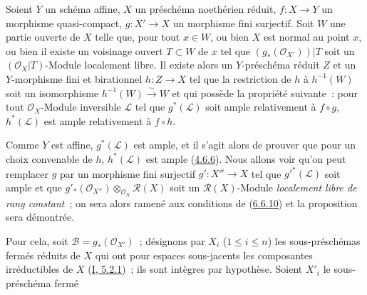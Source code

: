 \begin{proposition}[6.6.11]
\label{II.6.6.11-fr}
Soient $Y$ un schéma affine, $X$ un préschéma noethérien réduit,
$f:X\to Y$ un morphisme quasi-compact, $g:X'\to X$ un morphisme fini
surjectif. Soit $W$ une partie ouverte de $X$ telle que, pour tout $x\in W$,
ou bien $X$ est normal au point $x$, ou bien il existe un voisinage ouvert
$T\subset W$ de $x$ tel que $(g_*(\mathcal{O}_{X'}))|T$ soit un
$(\mathcal{O}_X|T)$-Module localement libre. Il existe alors un
$Y$-préschéma réduit $Z$ et un $Y$-morphisme fini et birationnel
$h:Z\to X$ tel que la restriction de $h$ à $h^{-1}(W)$ soit un isomorphisme
$h^{-1}(W)\xrightarrow{\sim}W$ et qui possède la propriété suivante~: pour
tout $\mathcal{O}_X$-Module inversible $\mathcal{L}$ tel que
$g^*(\mathcal{L})$ soit ample relativement à $f\circ g$, $h^*(\mathcal{L})$
est ample relativement à $f\circ h$.
\end{proposition}

Comme $Y$ est affine, $g^*(\mathcal{L})$ est ample, et il s'agit alors de
prouver que pour un choix convenable de $h$, $h^*(\mathcal{L})$ est ample
(\hyperref[II.4.6.6-fr]{4.6.6}). Nous allons voir qu'on peut remplacer $g$
par un morphisme fini surjectif $g':X''\to X$ tel que
${g'}^*(\mathcal{L})$ soit ample et que
$g'_*(\mathcal{O}_{X''})\otimes_{\mathcal{O}_X}\mathcal{R}(X)$ soit un
$\mathcal{R}(X)$-Module \emph{localement libre de rang constant}~; on sera
alors ramené aux conditions de (\hyperref[II.6.6.10-fr]{6.6.10}) et la
proposition sera démontrée.

Pour cela, soit $\mathcal{B}=g_*(\mathcal{O}_{X'})$~; désignons par $X_i$
($1\leq i\leq n$) les sous-préschémas fermés réduits de $X$ qui ont pour
espaces sous-jacents les composantes irréductibles de $X$
(\hyperref[I.5.2.1-fr]{I, 5.2.1})~; ils sont intègres par hypothèse. Soient
$X'_i$ le sous-préschéma fermé


